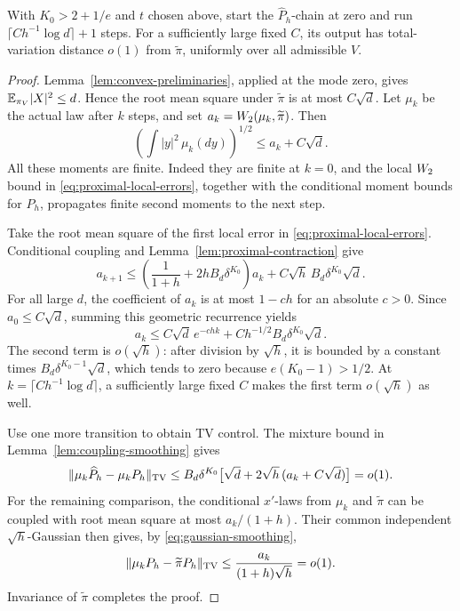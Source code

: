 \begin{proposition}
\label{prop:noised-mixing}
With $K_0>2+1/e$ and $t$ chosen above, start the
$\widehat P_h$-chain at zero and run
$\lceil Ch^{-1}\log d\rceil+1$ steps. For a sufficiently large
fixed $C$, its output has total-variation distance $o(1)$ from
$\widetilde\pi$, uniformly over all admissible $V$.
\end{proposition}
\begin{proof}
Lemma~\ref{lem:convex-preliminaries}, applied at the mode zero,
gives $\mathbb E_{\pi_V}|X|^2\le d$. Hence the root mean square under
$\widetilde\pi$ is at most $C\sqrt d$.
Let $\mu_k$ be the actual law after $k$ steps, and set
$a_k=W_2(\mu_k,\widetilde\pi)$. Then
\[
 \left(\int |y|^2\,\mu_k(dy)\right)^{1/2}
       \le a_k+C\sqrt d.
\]
All these moments are finite. Indeed they are finite at $k=0$, and
the local $W_2$ bound in \eqref{eq:proximal-local-errors}, together
with the conditional moment bounds for $P_h$, propagates finite
second moments to the next step.

Take the root mean square of the first local error in
\eqref{eq:proximal-local-errors}. Conditional coupling and
Lemma~\ref{lem:proximal-contraction} give
\[
 a_{k+1}\le
 \left(\frac1{1+h}+2hB_d\delta^{K_0}\right)a_k
       +C\sqrt h\,B_d\delta^{K_0}\sqrt d.
\]
For all large $d$, the coefficient of $a_k$ is at most $1-ch$
for an absolute $c>0$. Since $a_0\le C\sqrt d$, summing this
geometric recurrence yields
\begin{equation}\label{eq:proximal-global-error}
 a_k\le C\sqrt d\,e^{-chk}
       +Ch^{-1/2}B_d\delta^{K_0}\sqrt d.
\end{equation}
The second term is $o(\sqrt h)$: after division by $\sqrt h$,
it is bounded by a constant times
$B_d\delta^{K_0-1}\sqrt d$, which tends to zero because
$e(K_0-1)>1/2$. At $k=\lceil Ch^{-1}\log d\rceil$, a sufficiently
large fixed $C$ makes the first term $o(\sqrt h)$ as well.

Use one more transition to obtain TV control. The mixture bound
in Lemma~\ref{lem:coupling-smoothing} gives
\[
 \lVert\mu_k\widehat P_h-\mu_kP_h\rVert_{\mathrm{TV}}
 \le B_d\delta^{K_0}
       \bigl[\sqrt d+2\sqrt h\,(a_k+C\sqrt d)\bigr]=o(1).
\]
For the remaining comparison, the conditional $x'$-laws from
$\mu_k$ and $\widetilde\pi$ can be coupled with root mean square
at most $a_k/(1+h)$. Their common independent $\sqrt h$-Gaussian
then gives, by \eqref{eq:gaussian-smoothing},
\[
 \lVert\mu_kP_h-\widetilde\pi P_h\rVert_{\mathrm{TV}}
       \le\frac{a_k}{(1+h)\sqrt h}=o(1).
\]
Invariance of $\widetilde\pi$ completes the proof.
\end{proof}

